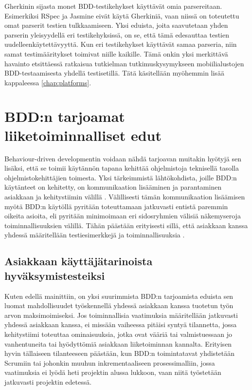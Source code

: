 \documentclass[finnish,nonumbib,nocopyright]{gradu2}
\begin{document}
Gherkinin sijasta monet BDD-testikehykset käyttävät omia parsereitaan. Esimerkiksi RSpec \cite{rspec} ja Jasmine \cite{jasmine} eivät käytä Gherkiniä, vaan niissä on toteutettu omat parserit testien tulkkaamiseen. Yksi eduista, joita saavutetaan yhden parserin yleisyydellä eri testikehyksissä, on se, että tämä edesauttaa testien uudelleenkäytettävyyttä. Kun eri testikehykset käyttävät samaa parseria, niin samat testimääritykset toimivat niille kaikille. Tämä onkin yksi merkittävä havainto etsittäessä ratkaisua tutkielman tutkimuskysymykseen mobiilialustojen BDD-testaamisesta yhdellä testisetillä. Tätä käsitellään myöhemmin lisää kappaleessa \ref{chap:platforms}.

\chapter{BDD:n tarjoamat liiketoiminnalliset edut}
Behaviour-driven developmentin voidaan nähdä tarjoavan muitakin hyötyjä sen lisäksi, että se toimii käytännön tapana kehittää ohjelmistoja teknisellä tasolla ohjelmistokehittäjien toimesta. Yksi tärkeimmistä lähtökohdista, joille BDD:n käytänteet on kehitetty, on kommunikaation lisääminen ja parantaminen asiakkaan ja kehitystiimin välillä \cite{specification}. Välillisesti tämän kommunikaation lisäämisen myötä BDD:n käytöllä pyritään toteuttamaan jatkuvasti entistä paremmin oikeita asioita, eli pyritään minimoimaan eri sidosryhmien välisiä näkemyseroja toiminnallisuuksien välillä. Tähän päästään erityisesti sillä, että asiakkaan kanssa yhdessä määritellään testiesimerkkejä ja toiminnallisuuksia \cite{businessdsl}.  

\section{Asiakkaan käyttäjätarinoista hyväksymistesteiksi}
Kuten edellä mainittiin, on yksi suurimmista BDD:n tarjoamista eduista sen luomat mahdollisuudet työskennellä yhdessä asiakkaan kanssa tuotetun työn arvon maksimoimiseksi. Jos toiminnallisia vaatimuksia määritellään jatkuvasti yhdessä asiakkaan kanssa, ei missään vaiheessa pitäisi syntyä tilannetta, jossa kehitystiimi toteuttaa ominaisuuksia, jotka ovat vääriä tai valmistuessaan jo vanhentuneita tai hyödyttömiä asiakkaan liiketoiminnan kannalta. Erityisen hyvin tällaiseen tilanteeseen päästään, kun BDD:n toimintatavat yhdistetään Scrumiin tai johonkin muuhun inkrementaaliseen prosessimalliin, jossa vaatimuksia ei lyödä heti projektin alussa lukkoon, vaan niitä työstetään jatkuvasti projektin edetessä.
\end{document}
